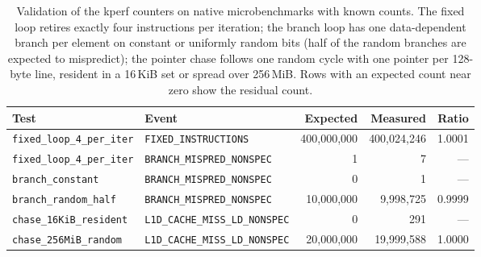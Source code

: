 \begin{table}[t]
\caption{Validation of the kperf counters on native microbenchmarks with known counts. The fixed loop retires exactly four instructions per iteration; the branch loop has one data-dependent branch per element on constant or uniformly random bits (half of the random branches are expected to mispredict); the pointer chase follows one random cycle with one pointer per 128-byte line, resident in a 16\,KiB set or spread over 256\,MiB. Rows with an expected count near zero show the residual count.}\label{tab:pmu_validation}
\footnotesize
\setlength{\tabcolsep}{4pt}%
\begin{adjustbox}{max width=\textwidth}%
\begin{tabular}{llrrr}
\toprule
Test & Event & Expected & Measured & Ratio \\
\midrule
\texttt{fixed\_loop\_4\_per\_iter} & \texttt{FIXED\_INSTRUCTIONS} & 400,000,000 & 400,024,246 & 1.0001 \\
\texttt{fixed\_loop\_4\_per\_iter} & \texttt{BRANCH\_MISPRED\_NONSPEC} & 1 & 7 & --- \\
\texttt{branch\_constant} & \texttt{BRANCH\_MISPRED\_NONSPEC} & 0 & 1 & --- \\
\texttt{branch\_random\_half} & \texttt{BRANCH\_MISPRED\_NONSPEC} & 10,000,000 & 9,998,725 & 0.9999 \\
\texttt{chase\_16KiB\_resident} & \texttt{L1D\_CACHE\_MISS\_LD\_NONSPEC} & 0 & 291 & --- \\
\texttt{chase\_256MiB\_random} & \texttt{L1D\_CACHE\_MISS\_LD\_NONSPEC} & 20,000,000 & 19,999,588 & 1.0000 \\
\bottomrule
\end{tabular}%
\end{adjustbox}
\end{table}
